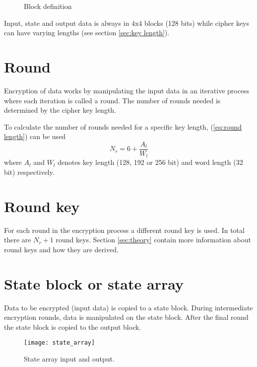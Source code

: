 \documentclass[report.tex]{subfiles}
\begin{document}
\begin{figure}[h]
\centering
	\caption{Block definition}
	\label{fig:block definition}
\end{figure}

Input, state and output data is always in 4x4 blocks (128 bits) while cipher keys can have varying lengths (see section \ref{sec:key length}).

\section{Round}
Encryption of data works by manipulating the input data in an iterative process where each iteration is called a round. The number of rounds needed is determined by the cipher key length.

To calculate the number of rounds needed for a specific key length, (\ref{eq:round length}) can be used
\begin{equation}\label{eq:round length}
	N_r = 6 + \frac{A_{l}}{W_{l}}
\end{equation}
where $A_l$ and $W_l$ denotes key length (128, 192 or 256 bit) and word length (32 bit) respectively.

\section{Round key}
For each round in the encryption process a different round key is used. In total there are $N_r+1$ round keys. Section \ref{sec:theory} contain more information about round keys and how they are derived.

\section{State block or state array}
Data to be encrypted (input data) is copied to a state block. During intermediate encryption rounds, data is manipulated on the state block. After the final round the state block is copied to the output block.%

\begin{figure}[h]
\centering
\texttt{[image: state\_array]}
\caption{State array input and output.\cite{fips}}
\label{fig:state array}
\end{figure}
\end{document}
